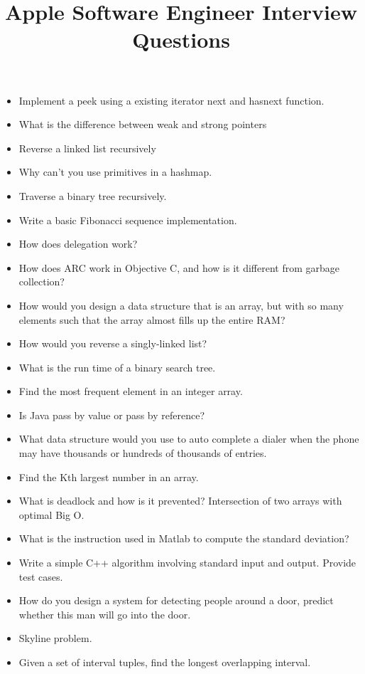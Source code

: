 \documentclass{article}
\begin{document}
\title{Apple Software Engineer Interview Questions}
\maketitle
\begin{itemize}
	\item Implement a peek using a existing iterator next and hasnext function.
	\item What is the difference between weak and strong pointers
	\item Reverse a linked list recursively
	\item Why can't you use primitives in a hashmap.
	\item Traverse a binary tree recursively.
	\item Write a basic Fibonacci sequence implementation. 
	\item How does delegation work?
	\item How does ARC work in Objective C, and how is it different from garbage collection?
	\item How would you design a data structure that is an array, but with so many elements such that the array almost fills up the entire RAM?
	\item How would you reverse a singly-linked list?
	\item What is the run time of a binary search tree.
	\item Find the most frequent element in an integer array.
	\item Is Java pass by value or pass by reference?
	\item What data structure would you use to auto complete a dialer when the phone may have thousands or hundreds of thousands of entries.
	\item Find the Kth largest number in an array.
	\item What is deadlock and how is it prevented? Intersection of two arrays with optimal Big O.
	\item What is the instruction used in Matlab to compute the standard deviation?
	\item Write a simple C++ algorithm involving standard input and output. Provide test cases.
	\item How do you design a system for detecting people around a door, predict whether this man will go into the door.
	\item Skyline problem.
	\item Given a set of interval tuples, find the longest overlapping interval.

\end{itemize}
\end{document}
